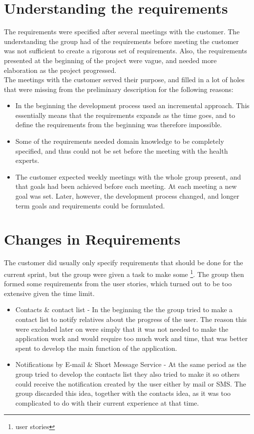 \section{Understanding the requirements}

The requirements were specified after several meetings with the customer. The understanding the group had of the requirements before meeting the customer was not sufficient to create a rigorous set of requirements. Also, the requirements presented at the beginning of the project were vague, and needed more elaboration as the project progressed. \\

The meetings with the customer served their purpose, and filled in a lot of holes that were missing from the preliminary description for the following reasons:
\begin{itemize}
\item In the beginning the development process used an incremental approach. This essentially means that the requirements expands as the time goes, and to define the requirements from the beginning was therefore impossible.
\item Some of the requirements needed domain knowledge to be completely specified, and thus could not be set before the meeting with the health experts.
\item The customer expected weekly meetings with the whole group present, and that goals had been achieved before each meeting. At each meeting a new goal was set. Later, however, the development process changed, and longer term goals and requirements could be formulated. 
\end{itemize}

\section{Changes in Requirements}

The customer did usually only specify requirements that should be done for the current sprint, but the group were given a task to make some \footnote{user stories}. The group then formed some requirements from the user stories, which turned out to be too extensive given the time limit.

\begin{itemize} 
\item Contacts \& contact list - In the beginning the the group tried to make a contact list to notify relatives about the progress of the user. The reason this were excluded later on were simply that it was not needed to make the application work and would require too much work and time, that was better spent to develop the main function of the application. 
\item Notifications by E-mail \& Short Message Service - At the same period as the group tried to develop the contacts list they also tried to make it so others could receive the notification created by the user either by mail or SMS. The group discarded this idea, together with the contacts idea, as it was too complicated to do with their current experience at that time.
\end{itemize} 
